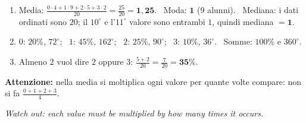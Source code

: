 \documentclass[11pt,a4paper]{article}
\newcommand{\errore}[2]{\begin{attenzione}\textbf{\color{fgA}Attenzione:} #1\par
  {\itshape\color{engray}Watch out: #2}\end{attenzione}}
\begin{document}
\begin{solbox}
\begin{minipage}{0.6\linewidth}
\begin{enumerate}
\item Media: $\frac{0\cdot4+1\cdot9+2\cdot5+3\cdot2}{20}=\frac{25}{20}=\mathbf{1,25}$. \ Moda: $\mathbf{1}$ (9 alunni). \ Mediana: i dati ordinati sono $20$; il $10^\circ$ e l'$11^\circ$ valore sono entrambi $1$, quindi mediana $=\mathbf{1}$.
\item $0$: $20\%$, $72^\circ$; \ $1$: $45\%$, $162^\circ$; \ $2$: $25\%$, $90^\circ$; \ $3$: $10\%$, $36^\circ$. \ Somme: $100\%$ e $360^\circ$. \checkmark
\item Almeno $2$ vuol dire $2$ oppure $3$: $\frac{5+2}{20}=\frac{7}{20}=\mathbf{35\%}$.
\end{enumerate}
\errore{nella media si moltiplica ogni valore per quante volte compare: non si fa $\frac{0+1+2+3}{4}$.}
{each value must be multiplied by how many times it occurs.}
\end{minipage}\hfill
\begin{minipage}{0.36\linewidth}\centering
\end{minipage}
\end{solbox}
\end{document}
